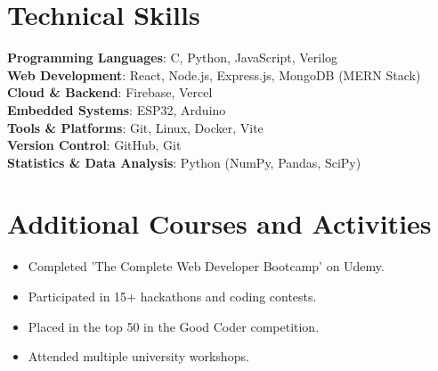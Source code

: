 \documentclass[letterpaper,11pt]{article}
\newcommand{\resumeItem}[1]{
  \item\small{
    {#1 \vspace{-2pt}}
  }
}
\newcommand{\resumeSubHeadingListStart}{\begin{itemize}[leftmargin=0.15in, label={}]}
\newcommand{\resumeSubHeadingListEnd}{\end{itemize}}
\begin{document}
\section{Technical Skills}
 \begin{itemize}[leftmargin=0.15in, label={}]
    \small{\item{
     \textbf{Programming Languages}{: C, Python, JavaScript, Verilog} \\
     \textbf{Web Development}{: React, Node.js, Express.js, MongoDB (MERN Stack)} \\
     \textbf{Cloud \& Backend}{: Firebase, Vercel} \\
     \textbf{Embedded Systems}{: ESP32, Arduino} \\
     \textbf{Tools \& Platforms}{: Git, Linux, Docker, Vite} \\
     \textbf{Version Control}{: GitHub, Git} \\
     \textbf{Statistics \& Data Analysis}{: Python (NumPy, Pandas, SciPy)}
    }}
 \end{itemize}

\section{Additional Courses and Activities}
  \resumeSubHeadingListStart
    \resumeItem{Completed 'The Complete Web Developer Bootcamp' on Udemy.}
    \resumeItem{Participated in 15+ hackathons and coding contests.}
    \resumeItem{Placed in the top 50 in the Good Coder competition.}
    \resumeItem{Attended multiple university workshops.}
  \resumeSubHeadingListEnd

\end{document}
